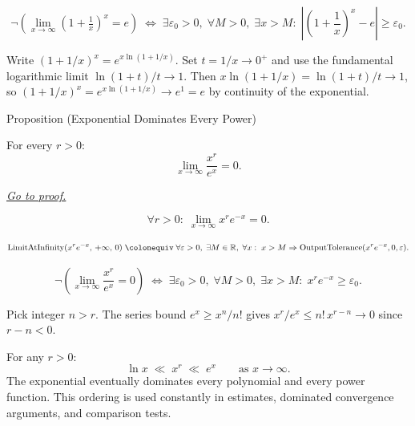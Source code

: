 \begin{remark*}
\[
  \neg\left(\lim_{x\to\infty}\!\left(1+\tfrac{1}{x}\right)^x=e\right)
  \;\iff\;
  \exists\varepsilon_0>0,\;\forall M>0,\;\exists x>M:\;
  \left|\!\left(1+\frac{1}{x}\right)^x - e\right|\geq\varepsilon_0.
\]
\end{remark*}

\begin{remark*}
Write $(1+1/x)^x = e^{x\ln(1+1/x)}$. Set $t = 1/x \to 0^+$ and use
the fundamental logarithmic limit $\ln(1+t)/t \to 1$. Then
$x\ln(1+1/x) = \ln(1+t)/t \to 1$, so $(1+1/x)^x = e^{x\ln(1+1/x)}
\to e^1 = e$ by continuity of the exponential.
\end{remark*}


\begin{propositionbox}{Proposition (Exponential Dominates Every Power)}
\begin{proposition}
\label{prop:exponential-dominates-power}
For every $r > 0$:
\[
  \lim_{x \to \infty} \frac{x^r}{e^x} = 0.
\]

\smallskip\noindent
\hyperref[prf:exponential-dominates-power]{\textit{Go to proof.}}
\end{proposition}
\end{propositionbox}

\begin{remark*}
\[
  \forall r > 0 :\; \lim_{x \to \infty} x^r e^{-x} = 0.
\]
\end{remark*}

\begin{remark*}
\[
  \operatorname{LimitAtInfinity}(x^r e^{-x},\,+\infty,\,0)
  \;\colonequiv\;
  \forall\varepsilon>0,\;\exists M\in\mathbb{R},\;\forall x:\;
  x>M \Rightarrow \operatorname{OutputTolerance}(x^r e^{-x},0,\varepsilon).
\]
\end{remark*}

\begin{remark*}
\[
  \neg\left(\lim_{x\to\infty}\frac{x^r}{e^x}=0\right)
  \;\iff\;
  \exists\varepsilon_0>0,\;\forall M>0,\;\exists x>M:\;
  x^r e^{-x} \geq \varepsilon_0.
\]
\end{remark*}

\begin{remark*}
Pick integer $n > r$. The series bound $e^x \geq x^n/n!$ gives
$x^r/e^x \leq n!\, x^{r-n} \to 0$ since $r - n < 0$.
\end{remark*}

\begin{remark*}
For any $r > 0$:
\[
  \ln x \;\ll\; x^r \;\ll\; e^x
  \qquad \text{as } x \to \infty.
\]
The exponential eventually dominates every polynomial and every
power function. This ordering is used constantly in estimates,
dominated convergence arguments, and comparison tests.
\end{remark*}
